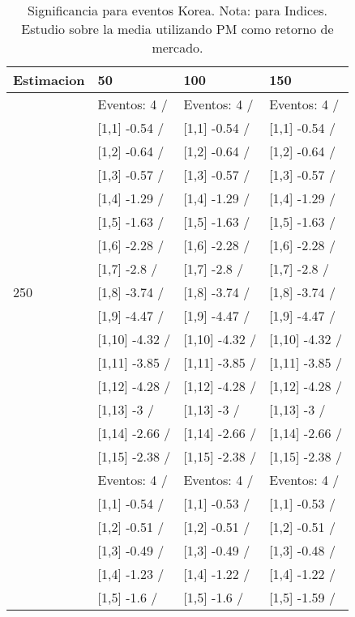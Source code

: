 \begin{table}

\caption{Significancia para eventos Korea. Nota: para Indices. Estudio sobre la media utilizando PM como retorno de mercado.}
\centering
\begin{tabular}[t]{llll}
\toprule
Estimacion & 50 & 100 & 150\\
\midrule
 & Eventos:  4 / & Eventos:  4 / & Eventos:  4 /\\
 & {}[1,1] -0.54  / & {}[1,1] -0.54  / & {}[1,1] -0.54  /\\
 & {}[1,2] -0.64  / & {}[1,2] -0.64  / & {}[1,2] -0.64  /\\
 & {}[1,3] -0.57  / & {}[1,3] -0.57  / & {}[1,3] -0.57  /\\
 & {}[1,4] -1.29  / & {}[1,4] -1.29  / & {}[1,4] -1.29  /\\
\addlinespace
 & {}[1,5] -1.63  / & {}[1,5] -1.63  / & {}[1,5] -1.63  /\\
 & {}[1,6] -2.28  / & {}[1,6] -2.28  / & {}[1,6] -2.28  /\\
 & {}[1,7] -2.8  / & {}[1,7] -2.8  / & {}[1,7] -2.8  /\\
250 & {}[1,8] -3.74  / & {}[1,8] -3.74  / & {}[1,8] -3.74  /\\
 & {}[1,9] -4.47  / & {}[1,9] -4.47  / & {}[1,9] -4.47  /\\
\addlinespace
 & {}[1,10] -4.32  / & {}[1,10] -4.32  / & {}[1,10] -4.32  /\\
 & {}[1,11] -3.85  / & {}[1,11] -3.85  / & {}[1,11] -3.85  /\\
 & {}[1,12] -4.28  / & {}[1,12] -4.28  / & {}[1,12] -4.28  /\\
 & {}[1,13] -3  / & {}[1,13] -3  / & {}[1,13] -3  /\\
 & {}[1,14] -2.66  / & {}[1,14] -2.66  / & {}[1,14] -2.66  /\\
\addlinespace
 & {}[1,15] -2.38  / & {}[1,15] -2.38  / & {}[1,15] -2.38  /\\
 & Eventos:  4 / & Eventos:  4 / & Eventos:  4 /\\
 & {}[1,1] -0.54  / & {}[1,1] -0.53  / & {}[1,1] -0.53  /\\
 & {}[1,2] -0.51  / & {}[1,2] -0.51  / & {}[1,2] -0.51  /\\
 & {}[1,3] -0.49  / & {}[1,3] -0.49  / & {}[1,3] -0.48  /\\
\addlinespace
 & {}[1,4] -1.23  / & {}[1,4] -1.22  / & {}[1,4] -1.22  /\\
 & {}[1,5] -1.6  / & {}[1,5] -1.6  / & {}[1,5] -1.59  /\\

\end{tabular}
\end{table}

